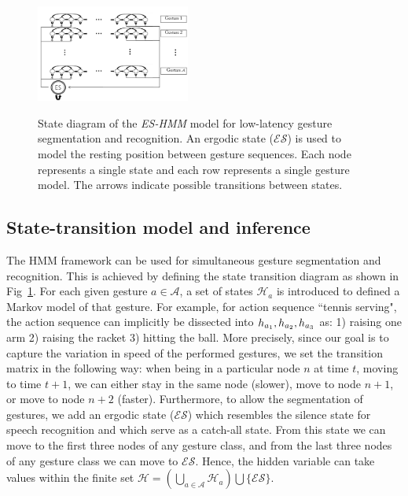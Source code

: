 \begin{figure}[t]
  \centering
  \includegraphics[width=0.45\textwidth]{images/HMM_2_new}\\
  \caption{
   \small{ State diagram of the \emph{ES-HMM} model for low-latency gesture segmentation and recognition. An ergodic state (\emph{$\mathcal{ES}$}) is used to model the resting position between gesture sequences. Each node represents a single state and each row represents a single gesture model. The arrows indicate possible transitions between states.}}
    \label{HMM_ES}
\end{figure}


\subsection{State-transition model and inference}
\label{sec:statemodel}


The HMM framework can be used for simultaneous gesture segmentation and recognition.
This is achieved by defining the state transition diagram as shown in Fig~\ref{HMM_ES}. For each given gesture $a \in \mathcal{A}$, a set of states $\mathcal{H}_a$ is introduced to defined a Markov model of that gesture. For example, for action sequence ``tennis serving", the action sequence can implicitly be dissected into $h_{a_1}, h_{a_2}, h_{a_3}$ as: 1) raising one arm 2) raising the racket 3) hitting the ball.
More precisely, since our goal is to capture the variation in speed of the performed gestures, we set the transition matrix \transitionmatrix{}  in the following way: when being in a particular node $n$ at time $t$, moving to time $t + 1$, we can either stay in the same node (slower), move to node $n + 1$, or move to node $n+2$ (faster).
%
Furthermore, to allow the segmentation of gestures, we add an ergodic state
(\emph{$\mathcal{ES}$}) which resembles the silence state for speech recognition and which serve as a catch-all state.
From this state we can move to the first three nodes of any gesture class, and from the last three nodes of any gesture class we can move to $\mathcal{ES}$.
Hence, the hidden variable \hiddenvariable{} can take values within the finite set
 $\mathcal{H}=(\bigcup _{a \in \mathcal{A}} \mathcal{H}_a) \bigcup \{\mathcal{ES}\}$.

